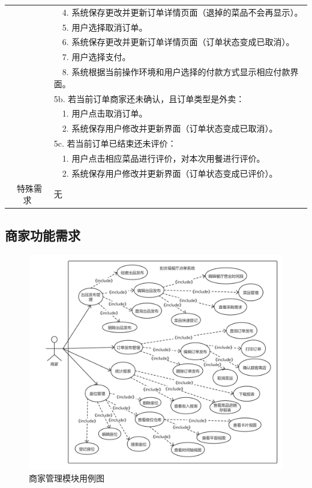 \begin{table}[htbp!]
\begin{tabular}{cp{11.5cm}}
    & ~~4.	系统保存更改并更新订单详情页面（退掉的菜品不会再显示）。\\
    & ~~5.	用户选择取消订单。\\
    & ~~6.	系统保存更改并更新订单详情页面（订单状态变成已取消）。\\
    & ~~7.	用户选择支付。\\
    & ~~8.	系统根据当前操作环境和用户选择的付款方式显示相应付款界面。\\
    & 5b. 若当前订单商家还未确认，且订单类型是外卖：\\
    & ~~1.	用户点击取消订单。\\
    & ~~2.	系统保存用户修改并更新界面（订单状态变成已取消）。\\
    & 5c. 若当前订单已结束还未评价：\\
    & ~~1.	用户点击相应菜品进行评价，对本次用餐进行评价。\\
    & ~~2.	系统保存用户修改并更新界面（订单状态变成已评价）。\\
  \hline
  \ 特殊需求 & 无 \\ 
  \hline
  \end{tabular}
  \label{table:uc4}
\end{table}
\subsection{商家功能需求}
\begin{figure}[htbp!]
  \centering
  \includegraphics[width=5in]{FIGs/chapter3/seller.pdf}
  \caption{商家管理模块用例图}\label{fig_sellerCH3}
\end{figure}


